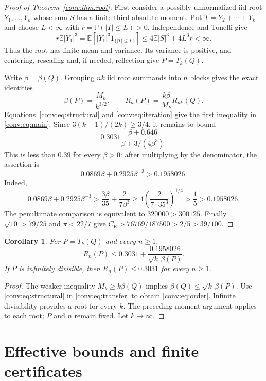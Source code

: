 \documentclass[11pt,a4paper]{article}
\numberwithin{equation}{section}
\newtheorem{corollary}[theorem]{Corollary}
\theoremstyle{definition}
\theoremstyle{remark}
\newcommand{\E}{\mathbb E}
\newcommand{\Prob}{\mathbb P}
\newcommand{\CE}{C_{\mathrm E}}
\begin{document}
\begin{proof}[Proof of Theorem~\ref{conv:thm:root}]
First consider a possibly unnormalized iid root $Y_1,\ldots,Y_k$ whose
sum $S$ has a finite third absolute moment. Put
$T=Y_2+\cdots+Y_k$ and choose $L<\infty$ with
$r=\Prob(|T|\le L)>0$. Independence and Tonelli give
\[
 r\E|Y_1|^3
 =\E[|Y_1|^3 1_{\{|T|\le L\}}]
 \le4\E|S|^3+4L^3r<\infty.
\]
Thus the root has finite mean and variance. Its variance is positive,
and centering, rescaling and, if needed, reflection give $P=T_k(Q)$.

Write $\beta=\beta(Q)$. Grouping $nk$ iid root summands into $n$ blocks
gives the exact identities
\begin{equation}\label{conv:eq:transfer}
 \beta(P)=\frac{M_k}{k^{3/2}},\qquad
 R_n(P)=\frac{k\beta}{M_k}R_{nk}(Q).
\end{equation}
Equations~\eqref{conv:eq:structural} and \eqref{conv:eq:iteration} give the first
inequality in \eqref{conv:eq:main}. Since $3(k-1)/(2k)\ge3/4$, it remains to
bound
\[
 0.3031\frac{\beta+0.646}{\beta+3/(4\beta^3)}.
\]
This is less than $0.39$ for every $\beta>0$: after multiplying by the
denominator, the assertion is
\[
 0.0869\beta+0.2925\beta^{-3}>0.1958026.
\]
Indeed,
\[
 0.0869\beta+0.2925\beta^{-3}
 >\frac{3\beta}{35}+\frac{2}{7\beta^3}
 \ge4\left(\frac{2}{7\cdot35^3}\right)^{1/4}
 >\frac15>0.1958026.
\]
The penultimate comparison is equivalent to $320000>300125$.
Finally $\sqrt{10}>79/25$ and $\pi<22/7$ give
$\CE>76769/187500>2/5>39/100$.
\end{proof}

\begin{corollary}\label{conv:cor:infdiv}
For $P=T_k(Q)$ and every $n\ge1$,
\begin{equation}\label{conv:eq:order}
 R_n(P)\le0.3031+
 \frac{0.1958026}{\sqrt{k}\,\beta(P)}.
\end{equation}
If $P$ is infinitely divisible, then $R_n(P)\le0.3031$ for every $n\ge1$.
\end{corollary}
\begin{proof}
The weaker inequality $M_k\ge k\beta(Q)$ implies
$\beta(Q)\le\sqrt{k}\,\beta(P)$. Use \eqref{conv:eq:structural} in
\eqref{conv:eq:transfer} to obtain \eqref{conv:eq:order}. Infinite divisibility
provides a root for every $k$. The preceding moment argument applies to
each root; $P$ and $n$ remain fixed. Let $k\to\infty$.
\end{proof}

\clearpage
\part{Effective bounds and finite certificates}\label{part:effective}
\end{document}
